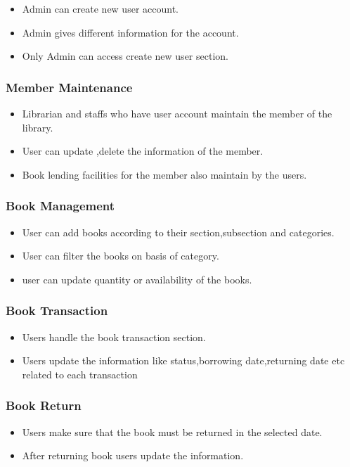 \begin{itemize}
    \item Admin can create new user account.
    \item Admin gives different information for the account.
    \item Only Admin can access create new user section.
\end{itemize}

\subsubsection{Member Maintenance}

\begin{itemize}
    \item Librarian and staffs who have user account maintain the member of the library.
    \item User can update ,delete the information of the member.
    \item Book lending facilities for the member also maintain by the users.
\end{itemize}

\subsubsection{Book Management}

\begin{itemize}
    \item User can add books according to their section,subsection and categories.
    \item User can filter the books on basis of category.
    \item user can update quantity or availability of the books.
\end{itemize}

\subsubsection{Book Transaction}

\begin{itemize}
    \item Users handle the book transaction section.
    \item Users update the information like status,borrowing date,returning date etc related to each transaction
\end{itemize}

\subsubsection{Book Return}
\begin{itemize}
    \item Users make sure that the book must be returned in the selected date.
    \item After returning book users update the information. 
\end{itemize}



